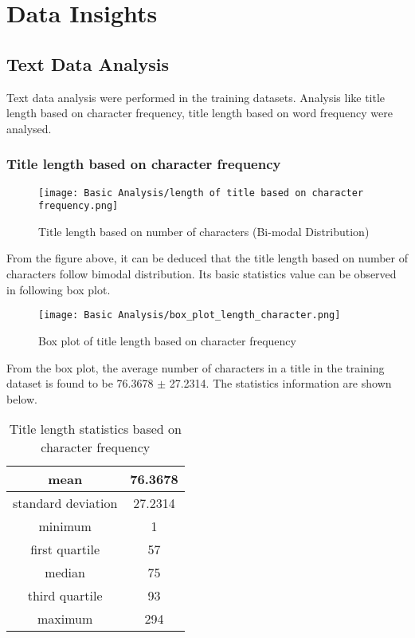 \chapter{Data Insights}
\section{Text Data Analysis}
Text data analysis were performed in the training datasets. Analysis like title length based on character frequency, title length based on word frequency were analysed.

\subsection{Title length based on character frequency}
\begin{figure}[H]
    \centering
    \texttt{[image: Basic Analysis/length of title based on character frequency.png]}
    \caption{Title length based on number of characters
    (Bi-modal Distribution)}
    \label{fig:Title length based on number of characters}
\end{figure}

From the figure above, it can be deduced that the title length based on number of characters follow bimodal distribution. Its basic statistics value can be observed in following box plot.

\begin{figure}[H]
    \centering
    \texttt{[image: Basic Analysis/box\_plot\_length\_character.png]}
    \caption{Box plot of title length based on character frequency}
    \label{fig:Box plot of title length based on character frequency}
\end{figure}

From the box plot, the average number of characters in a title in the training dataset is found to be 76.3678 $\pm$ 27.2314. The statistics information are shown below.

\begin{table}[H]
    \begin{center}
        \begin{tabular}{ |c|c| }
            \hline
            mean               & 76.3678 \\
            \hline
            standard deviation & 27.2314 \\
            \hline
            minimum            & 1       \\
            \hline
            first quartile     & 57      \\
            \hline
            median             & 75      \\
            \hline
            third quartile     & 93      \\
            \hline
            maximum            & 294     \\
            \hline
        \end{tabular}
    \end{center}
    \caption{Title length statistics based on character frequency}
    \label{table:Title length statistics based on character frequency}
\end{table}

